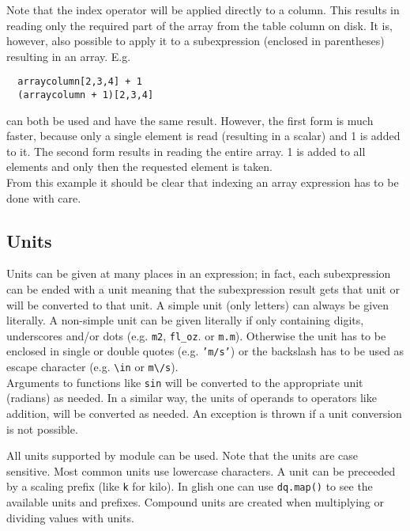 Note that the index operator will be applied directly
to a column. This results in reading only the required part of the
array from the table column on disk.
It is, however, also possible to apply it to a
subexpression (enclosed in parentheses) resulting in an array.
E.g.
\begin{verbatim}
  arraycolumn[2,3,4] + 1
  (arraycolumn + 1)[2,3,4]
\end{verbatim}
can both be used and have the same result. However, the first
form is much faster, because only a single element is read
(resulting in a scalar) and 1 is added to it.
The second form results in reading the entire array.
1 is added to all elements and only then the requested element is taken.
\\From this example it should be clear that indexing an array
expression has to be done with care.

\subsection{\label{TAQL:UNITS}Units}
Units can be given at many places in an expression; in fact, each
subexpression can be ended with a unit meaning that the subexpression
result gets that unit or will be converted to that unit. A simple
unit (only letters) can always be given literally. A non-simple unit
can be given literally if only containing digits, underscores and/or
dots (e.g. \texttt{m2}, \texttt{fl\_oz}. or \texttt{m.m}).
Otherwise the unit has to be enclosed in single or double quotes
(e.g. \texttt{'m/s'}) or the backslash has to be used as escape
character (e.g. \verb+\+\texttt{in} or \texttt{m}\verb+\+\texttt{/s}).
\\Arguments to functions like \texttt{sin} will be converted to the
appropriate unit (radians) as needed. In a similar way, the units of
operands to operators like addition, will be converted as needed.
An exception is thrown if a unit conversion is not possible.

All units supported by module
can be used. Note that the
units are case sensitive. Most common units use lowercase characters.
A unit can be preceeded by a scaling prefix (like \texttt{k} for kilo).
In glish one can use \texttt{dq.map()} to see the available units and
prefixes. Compound units are created when multiplying or
dividing values with units.

